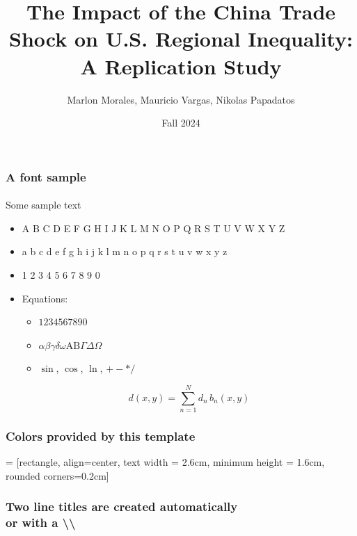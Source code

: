 \documentclass{beamer}
\title{The Impact of the China Trade Shock on U.S. Regional Inequality: A Replication Study}
\date{Fall 2024}
\author{
    Marlon Morales, Mauricio Vargas, Nikolas Papadatos
}
\begin{document}
\insertTitleSlide



\begin{frame} 
\frametitle{A font sample} 
\framesubtitle{\printcurrentfont} 

Some sample text
\begin{itemize}
	\item A B C D E F G H I J K L M N O P Q R S T U V W X Y Z
	\item a b c d e f g h i j k l m n o p q r s t u v w x y z
	\item 1 2 3 4 5 6 7 8 9 0
	\item Equations:
	\begin{itemize}
		\item $1 2 3 4 5 6 7 8 9 0$
		\item $\alpha \beta \gamma \delta \omega \text{A} \text{B} \Gamma \Delta \Omega$
		\item $\sin$, $\cos$, $\ln$, $+ - * /$
	\end{itemize}
	
	\begin{equation}
		d\left( x, y \right) = \sum_{n=1}^N d_n \, b_n \left( x, y \right)
	\end{equation}
\end{itemize}

\end{frame}



\begin{frame}[fragile]
\frametitle{Colors provided by this template}
\centering
{} = [rectangle,
                               align=center, 
                               text width = 2.6cm,
                               minimum height = 1.6cm,
                               rounded corners=0.2cm]
                               
\newcommand{\colorSampleNode}[2]{
    \node[colorSampleNodeTemplate, fill=#1, text=#2] 
        {#1\\\HTMLcolor{#1}};
        }


\end{frame}



\begin{frame} 
\frametitle{Two line titles are created automatically\\or with a \textbackslash\textbackslash}  
\lipsum[1]
\end{frame}


\insertLastSlide
\end{document}
